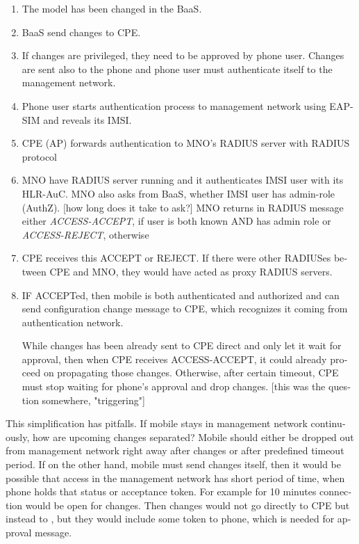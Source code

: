 \documentclass[12pt,a4paper,english]{tutthesis}
\begin{document}
\begin{otherlanguage}{english}
\begin{enumerate}
\item The model has been changed in the BaaS.
\item BaaS send changes to CPE.
\item If changes are privileged, they need to be approved by phone user.
Changes are sent also to the phone and phone user must authenticate
itself to the management network.
\item Phone user starts authentication process to management
network using EAP-SIM and reveals its IMSI.
\item CPE  (AP) forwards authentication to MNO's RADIUS server with
RADIUS protocol
\item MNO have RADIUS server running and it authenticates IMSI user with
  its HLR-AuC.
MNO also asks from BaaS, whether IMSI user has admin-role (AuthZ). [how long does it take to ask?]
MNO returns in RADIUS message either \emph{ACCESS-ACCEPT}, if user is both known AND has admin role 
  or \emph{ACCESS-REJECT}, otherwise
\item CPE receives this ACCEPT or REJECT. If there were other RADIUSes
between CPE and MNO, they would have acted
as proxy RADIUS servers.
\item IF ACCEPTed, then mobile is both authenticated and authorized and
can send configuration change message to CPE, which recognizes it
coming from authentication network.

While changes has been already sent to CPE direct and only let it
wait for approval, then when CPE receives ACCESS-ACCEPT, it could
already proceed on propagating those
changes.  Otherwise, after certain timeout, CPE must stop waiting
for phone's approval and drop changes. [this was the question
somewhere, "triggering"]
\end{enumerate}

This simplification has pitfalls. If mobile stays in management
network continuously, how are upcoming changes separated? Mobile should
either be dropped out from management network right away after changes or
after predefined timeout period.  If on the other hand, mobile must
send changes itself, then it would be possible that access in the
management network has short period of time, when phone 
holds that status or acceptance token. For example for 10 minutes connection
would be open for changes. Then changes would not go directly to CPE
but instead to , but they would include some token to phone, which is
needed for approval message.



\end{otherlanguage}
\end{document}
